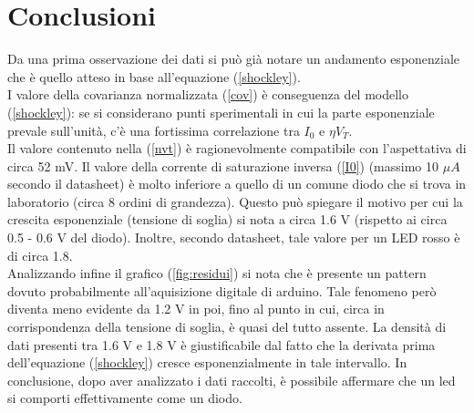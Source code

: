 \documentclass[11pt,a4paper]{article}
\begin{document}
\section{Conclusioni}
	Da una prima osservazione dei dati si pu\`{o} gi\`{a} notare un andamento esponenziale che \`{e} quello atteso in base all'equazione (\ref{shockley}).\\
	I valore della covarianza normalizzata (\ref{cov}) \`{e} conseguenza del modello (\ref{shockley}): se si considerano punti sperimentali in cui la parte esponenziale prevale sull'unit\`{a}, c'\`{e} una fortissima correlazione tra $I_0$ e $\eta V_T$. \\
	Il valore contenuto nella (\ref{nvt}) \`{e} ragionevolmente compatibile con l'aspettativa di circa 52 mV. Il valore della corrente di saturazione inversa (\ref{I0}) (massimo 10 $\mu A$ secondo il datasheet) \`{e} molto inferiore a quello di un comune diodo che si trova in laboratorio (circa 8 ordini di grandezza). Questo pu\`{o} spiegare il motivo per cui la crescita esponenziale (tensione di soglia) si nota a circa 1.6 V (rispetto ai circa 0.5 - 0.6 V del diodo). Inoltre, secondo datasheet, tale valore per un LED rosso \`{e} di circa 1.8. \\
	Analizzando infine il grafico (\ref{fig:residui}) si nota che è presente un pattern dovuto probabilmente all'aquisizione digitale di arduino. Tale fenomeno però diventa meno evidente da 1.2 V in poi, fino al punto in cui, circa in corrispondenza della tensione di soglia, \`{e} quasi del tutto assente. La densit\`{a} di dati presenti tra 1.6 V e 1.8 V \`{e} giustificabile dal fatto che la derivata prima dell'equazione (\ref{shockley}) cresce esponenzialmente in tale intervallo.
	In conclusione, dopo aver analizzato i dati raccolti, è possibile affermare che un led si comporti effettivamente come un diodo.
	 
	
\end{document}
